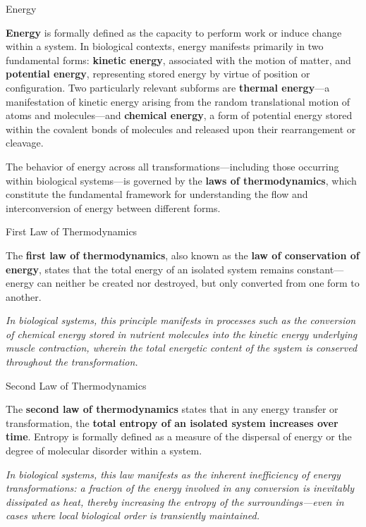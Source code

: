 \documentclass[10pt]{article}
\begin{document}
    \begin{core}{Energy}

      \textbf{Energy} is formally defined as the capacity to perform work or induce change within a system. In biological contexts, energy manifests primarily in two fundamental forms: \textbf{kinetic energy}, associated with the motion of matter, and \textbf{potential energy}, representing stored energy by virtue of position or configuration. Two particularly relevant subforms are \textbf{thermal energy}---a manifestation of kinetic energy arising from the random translational motion of atoms and molecules---and \textbf{chemical energy}, a form of potential energy stored within the covalent bonds of molecules and released upon their rearrangement or cleavage.

    \end{core}

    The behavior of energy across all transformations---including those occurring within biological systems---is governed by the \textbf{laws of thermodynamics}, which constitute the fundamental framework for understanding the flow and interconversion of energy between different forms.

    \begin{core}{First Law of Thermodynamics}

      The \textbf{first law of thermodynamics}, also known as the \textbf{law of conservation of energy}, states that the total energy of an isolated system remains constant---energy can neither be created nor destroyed, but only converted from one form to another. 

      \textit{In biological systems, this principle manifests in processes such as the conversion of chemical energy stored in nutrient molecules into the kinetic energy underlying muscle contraction, wherein the total energetic content of the system is conserved throughout the transformation.}

    \end{core}

    \begin{core}{Second Law of Thermodynamics}

      The \textbf{second law of thermodynamics} states that in any energy transfer or transformation, the \textbf{total entropy of an isolated system increases over time}. Entropy is formally defined as a measure of the dispersal of energy or the degree of molecular disorder within a system. 

      \textit{In biological systems, this law manifests as the inherent inefficiency of energy transformations: a fraction of the energy involved in any conversion is inevitably dissipated as heat, thereby increasing the entropy of the surroundings---even in cases where local biological order is transiently maintained.}

    \end{core}
\end{document}
